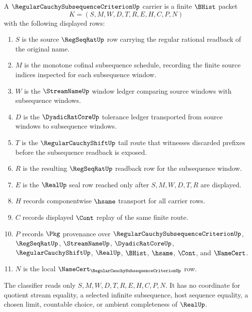 \begin{definition}
\label{def:regular-cauchy-subsequence-criterion-carrier}
A $\RegularCauchySubsequenceCriterionUp$ carrier is a finite $\BHist$ packet
$$
K=(S,M,W,D,T,R,E,H,C,P,N)
$$
with the following displayed rows:
\begin{enumerate}
\item $S$ is the source $\RegSeqRatUp$ row carrying the regular rational readback of the original name.
\item $M$ is the monotone cofinal subsequence schedule, recording the finite source indices inspected for each subsequence window.
\item $W$ is the $\StreamNameUp$ window ledger comparing source windows with subsequence windows.
\item $D$ is the $\DyadicRatCoreUp$ tolerance ledger transported from source windows to subsequence windows.
\item $T$ is the $\RegularCauchyShiftUp$ tail route that witnesses discarded prefixes before the subsequence readback is exposed.
\item $R$ is the resulting $\RegSeqRatUp$ readback row for the subsequence window.
\item $E$ is the $\RealUp$ seal row reached only after $S,M,W,D,T,R$ are displayed.
\item $H$ records componentwise $\hsame$ transport for all carrier rows.
\item $C$ records displayed $\Cont$ replay of the same finite route.
\item $P$ records $\Pkg$ provenance over $\RegularCauchySubsequenceCriterionUp$, $\RegSeqRatUp$, $\StreamNameUp$, $\DyadicRatCoreUp$, $\RegularCauchyShiftUp$, $\RealUp$, $\BHist$, $\hsame$, $\Cont$, and $\NameCert$.
\item $N$ is the local $\NameCert_{\RegularCauchySubsequenceCriterionUp}$ row.
\end{enumerate}
The classifier reads only $S,M,W,D,T,R,E,H,C,P,N$. It has no coordinate for quotient stream equality, a selected infinite subsequence, host sequence equality, a chosen limit, countable choice, or ambient completeness of $\RealUp$.
\end{definition}

